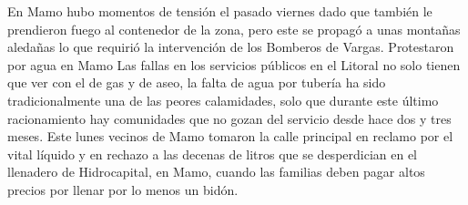 \documentclass{article}%
\begin{document}
\newline%
%
En Mamo hubo momentos de tensión el pasado viernes dado que también le prendieron fuego al contenedor de la zona, pero este se propagó a unas montañas aledañas lo que requirió la intervención de los Bomberos de Vargas.%
\newline%
%
Protestaron por agua en Mamo%
\newline%
%
Las fallas en los servicios públicos en el Litoral no solo tienen que ver con el de gas y de aseo, la falta de agua por tubería ha sido tradicionalmente una de las peores calamidades, solo que durante este último racionamiento hay comunidades que no gozan del servicio desde hace dos y tres meses.%
\newline%
%
Este lunes vecinos de Mamo tomaron la calle principal en reclamo por el vital líquido y en rechazo a las decenas de litros que se desperdician en el llenadero de Hidrocapital, en Mamo, cuando las familias deben pagar altos precios por llenar por lo menos un bidón.%
\newline%
%
\end{document}
